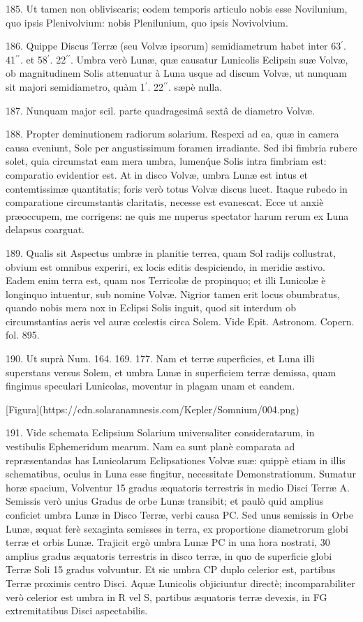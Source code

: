 \documentclass[a4paper, 11pt, oneside, polutonikogreek, german]{article}
\begin{document}
185. Ut tamen non obliviscaris; eodem temporis articulo nobis esse Novilunium, quo ipsis Plenivolvium: nobis Plenilunium, quo ipsis Novivolvium.

186. Quippe Discus Terræ (seu Volvæ ipsorum) semidiametrum habet inter 63$^{\prime}$. 41$^{\prime\prime}$. et 58$^{\prime}$. 22$^{\prime\prime}$. Umbra verò Lunæ, quæ causatur Lunicolis Eclipsin suæ Volvæ, ob magnitudinem Solis attenuatur à Luna usque ad discum Volvæ, ut nunquam sit majori semidiametro, quàm 1$^{\prime}$. 22$^{\prime\prime}$. sæpè nulla.

187. Nunquam major scil. parte quadragesimâ sextâ de diametro Volvæ.

188. Propter deminutionem radiorum solarium. Respexi ad ea, quæ in camera causa eveniunt, Sole per angustissimum foramen irradiante. Sed ibi fimbria rubere solet, quia circumstat eam mera umbra, lumen\'que Solis intra fimbriam est: comparatio evidentior est. At in disco Volvæ, umbra Lunæ est intus et contemtissimæ quantitatis; foris verò totus Volvæ discus lucet. Itaque rubedo in comparatione circumstantis claritatis, necesse est evanescat. Ecce ut anxiè præoccupem, me corrigens: ne quis me nuperus spectator harum rerum ex Luna delapsus coarguat.

189. Qualis sit Aspectus umbræ in planitie terrea, quam Sol radijs collustrat, obvium est omnibus experiri, ex locis editis despiciendo, in meridie æstivo. Eadem enim terra est, quam nos Terricolæ de propinquo; et illi Lunicolæ è longinquo intuentur, sub nomine Volvæ. Nigrior tamen erit locus obumbratus, quando nobis mera nox in Eclipsi Solis inguit, quod sit interdum ob circumstantias aeris vel auræ cœlestis circa Solem. Vide Epit. Astronom. Copern. fol. 895.

190. Ut suprà Num. 164. 169. 177. Nam et terræ superficies, et Luna illi superstans versus Solem, et umbra Lunæ in superficiem terræ demissa, quam fingimus speculari Lunicolas, moventur in plagam unam et eandem.

[Figura](https://cdn.solaranamnesis.com/Kepler/Somnium/004.png)

191. Vide schemata Eclipsium Solarium universaliter consideratarum, in vestibulis Ephemeridum mearum. Nam ea sunt planè comparata ad repræsentandas has Lunicolarum Eclipsationes Volvæ suæ: quippè etiam in illis schematibus, oculus in Luna esse fingitur, necessitate Demonstrationum. Sumatur horæ spacium, Volventur 15 gradus æquatoris terrestris in medio Disci Terræ A. Semissis verò unius Gradus de orbe Lunæ transibit; et paulò quid amplius conficiet umbra Lunæ in Disco Terræ, verbi causa PC. Sed unus semissis in Orbe Lunæ, æquat ferè sexaginta semisses in terra, ex proportione diametrorum globi terræ et orbis Lunæ. Trajicit ergò umbra Lunæ PC in una hora nostrati, 30 amplius gradus æquatoris terrestris in disco terræ, in quo de superficie globi Terræ Soli 15 gradus volvuntur. Et sic umbra CP duplo celerior est, partibus Terræ proximis centro Disci. Aquæ Lunicolis objiciuntur directè; incomparabiliter verò celerior est umbra in R vel S, partibus æquatoris terræ devexis, in FG extremitatibus Disci aspectabilis.
\end{document}
